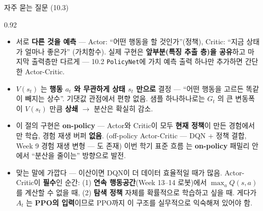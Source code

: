 \begin{frame}{자주 묻는 질문 (10.3)}
\begin{center}\begin{varwidth}{0.92\textwidth}
  \small
  \begin{itemize}
    \item {}
      서로 \textbf{다른 것을 예측} --- Actor: ``어떤 행동을 할
      것인가''(정책), Critic: ``지금 상태가 얼마나 좋은가''
      (가치함수). 실제 구현은 \textbf{앞부분(특징 추출 층)을
      공유}하고 마지막 출력층만 다르게 --- 10.2
      \texttt{PolicyNet}에 가치 예측 출력 하나만 추가하면
      간단한 Actor-Critic.
    \item {}
      $V(s_t)$ 는 \textbf{행동 $a_t$ 와 무관하게 상태 $s_t$
      만으로} 결정 --- ``어떤 행동을 고르든 똑같이 빼지는
      상수''. 기댓값 관점에서 편향 없음. 샘플 하나하나로는
      $G_t$ 의 큰 변동폭이 $V(s_t)$ 만큼 \textbf{상쇄}
      $\to$ 분산은 확실히 감소.
    \item {}
      이 절의 구현은 \textbf{on-policy} --- Actor와 Critic이 모두
      \textbf{현재 정책}이 만든 경험에서만 학습, 경험 재생
      버퍼 \textbf{없음}. (off-policy Actor-Critic --- DQN +
      정책 결합, Week 9 경험 재생 변형 --- 도 존재) 이번 학기
      표준 흐름 는 \textbf{on-policy}
      패밀리 안에서 ``분산을 줄이는'' 방향으로 발전.
    \item {}
      맞는 말에 가깝다 --- 이산이면 DQN이 더 데이터 효율적일
      때가 많음. Actor-Critic이 \textbf{필수}인 순간:
      (1) \textbf{연속 행동공간}(Week 13--14 로봇)에서
      $\max_a Q(s,a)$ 를 계산할 수 없을 때,
      (2) \textbf{탐색 정책} 자체를 확률적으로 학습하고 싶을
      때. 게다가 $A_t$ 는 \textbf{PPO의 입력}이므로 PPO까지
      이 구조를 실무적으로 익숙해져 있어야 함.
  \end{itemize}
  \normalsize
\end{varwidth}\end{center}
\end{frame}
